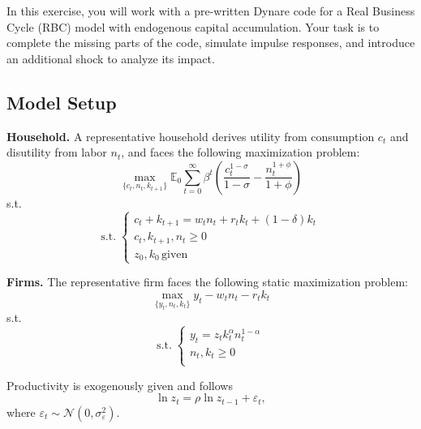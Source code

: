 \documentclass[dvipsnames,11pt]{article}
\begin{document}
    In this exercise, you will work with a pre-written Dynare code for a Real Business Cycle (RBC) model with endogenous capital accumulation. Your task is to complete the missing parts of the code, simulate impulse responses, and introduce an additional shock to analyze its impact. 

    \subsection{Model Setup}

        \textbf{Household.} A representative household derives utility from consumption \( c_t \) and disutility from labor \( n_t \), and faces the following maximization problem:
        \begin{equation}\label{eq:e3a_utility}
            \max_{\{c_t, n_t, k_{t+1}\}} \mathbb{E}_0 \sum_{t=0}^\infty \beta^t \left( \frac{c_t^{1-\sigma}}{1 - \sigma} - \frac{n_t^{1+\phi}}{1 + \phi} \right)
        \end{equation}
        s.t.
        \begin{equation}
            \mathrm{s.t.}\; 
            \begin{cases}
            c_t + k_{t+1} = w_t n_t + r_t k_t + (1 - \delta) k_t	\\
            c_t, k_{t+1}, n_t \geq 0 \\
            z_0,k_0\,\text{given}
            \end{cases}
        \end{equation}
          
        \noindent \textbf{Firms.} The representative firm faces the following static maximization problem:
        \begin{equation}
            \max_{\{y_t, n_t, k_t\}} y_t - w_t n_t -  r_t k_t
        \end{equation}
        s.t.
        \begin{equation}
            \mathrm{s.t.}\; 
            \begin{cases}
            y_t = z_t k_t^{\alpha} n_t^{1 - \alpha} \\
            n_t, k_{t} \geq 0 \\
            \end{cases}
        \end{equation}

        Productivity is exogenously given and follows
        \[
        \ln z_t = \rho \ln z_{t-1} + \varepsilon_t,
        \]
        where \( \varepsilon_t \sim \mathcal{N}(0, \sigma^2_{\varepsilon}) \).
\end{document}
